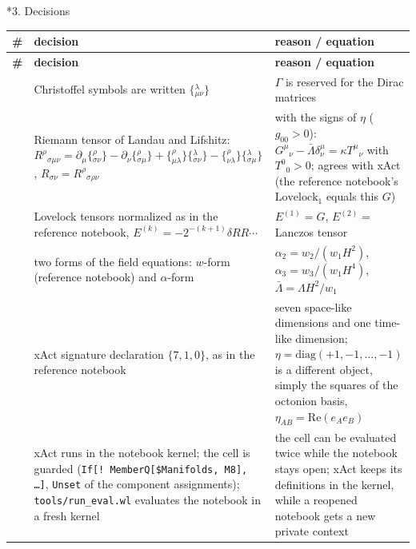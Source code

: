 \documentclass[10pt,a4paper]{article}
\makeatletter
\renewcommand\section{\@startsection{section}{1}{\z@}{-3.5ex \@plus -1ex \@minus -.2ex}{2.3ex \@plus.2ex}{\normalfont\Large\bfseries\raggedright}}
\makeatother
\begin{document}
\section*{3. Decisions}
{\footnotesize
\begin{longtable}{>{\raggedright\arraybackslash}p{}>{\raggedright\arraybackslash}p{}>{\raggedright\arraybackslash}p{}}
\toprule
\textbf{\#} & \textbf{decision} & \textbf{reason / equation} \\
\midrule\endfirsthead
\toprule
\textbf{\#} & \textbf{decision} & \textbf{reason / equation} \\
\midrule\endhead
\endfoot
\bottomrule\endlastfoot
1 & Christoffel symbols are written $\{{}^{\lambda}_{\mu\nu}\}$ & $\Gamma$ is reserved for the Dirac matrices \\
2 & Riemann tensor of Landau and Lifshitz: $R^\rho{}_{\sigma\mu\nu}=\partial_\mu\{{}^\rho_{\sigma\nu}\}-\partial_\nu\{{}^\rho_{\sigma\mu}\}+\{{}^\rho_{\mu\lambda}\}\{{}^\lambda_{\sigma\nu}\}-\{{}^\rho_{\nu\lambda}\}\{{}^\lambda_{\sigma\mu}\}$, $R_{\sigma\nu}=R^\rho{}_{\sigma\rho\nu}$ & with the signs of $\eta$ ($g_{00}>0$): $G^\mu{}_\nu-\bar\Lambda\delta^\mu_\nu=\kappa T^\mu{}_\nu$ with $T^0{}_0>0$; agrees with xAct (the reference notebook’s $\mathrm{Lovelock}_1$ equals this $G$) \\
3 & Lovelock tensors normalized as in the reference notebook, $E^{(k)}=-2^{-(k+1)}\delta RR\cdots$ & $E^{(1)}=G$, $E^{(2)}=$ Lanczos tensor \\
4 & two forms of the field equations: $w$-form (reference notebook) and $\alpha$-form & $\alpha_2=w_2/(w_1H^2)$, $\alpha_3=w_3/(w_1H^4)$, $\bar\Lambda=\Lambda H^2/w_1$ \\
5 & xAct signature declaration $\{7,1,0\}$, as in the reference notebook & seven space-like dimensions and one time-like dimension; $\eta=\mathrm{diag}(+1,-1,\dots,-1)$ is a different object, simply the squares of the octonion basis, $\eta_{AB}=\mathrm{Re}(e_Ae_B)$ \\
6 & xAct runs in the notebook kernel; the cell is guarded (\texttt{If[! MemberQ[\$Manifolds, M8], …]}, \texttt{Unset} of the component assignments); \texttt{tools/\allowbreak{}run\_\allowbreak{}eval.wl} evaluates the notebook in a fresh kernel & the cell can be evaluated twice while the notebook stays open; xAct keeps its definitions in the kernel, while a reopened notebook gets a new private context \\

\end{longtable}}
\end{document}
